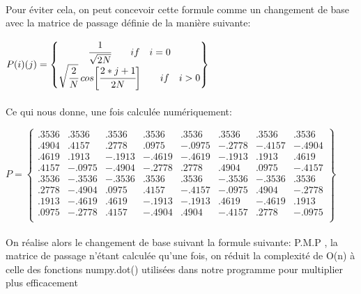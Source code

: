 \documentclass[12pt]{article}
\begin{document}
\paragraph{}
Pour éviter cela, on peut concevoir cette formule comme un changement de base avec la matrice de passage définie de la manière suivante:
\begin{center}
$P(i)(j)=
\begin{Bmatrix}
\cfrac{1}{\sqrt{2N}}  \qquad if \quad i=0 \\
\sqrt{\cfrac{2}{N}} \: cos\biggl[\cfrac{2*j+1}{2N}\biggr] \qquad if \quad i>0 \\
\end{Bmatrix}
$
\end{center}
\paragraph{}
Ce qui nous donne, une fois calculée numériquement:
\begin{center}

$P=
\begin{Bmatrix}

.3536& .3536& .3536& .3536& .3536& .3536& .3536& .3536 \\
.4904& .4157& .2778& .0975& -.0975& -.2778& -.4157& -.4904 \\
.4619& .1913& -.1913& -.4619& -.4619& -.1913& .1913& .4619 \\
.4157& -.0975& -.4904& -.2778 & .2778& .4904& .0975& -.4157 \\
.3536& -.3536& -.3536& .3536& .3536& -.3536& -.3536& .3536 \\
.2778& -.4904& .0975& .4157& -.4157& -.0975& .4904& -.2778 \\
.1913& -.4619& .4619& -.1913& -.1913& .4619& -.4619& .1913 \\
.0975& -.2778& .4157& -.4904& .4904& -.4157& .2778& -.0975 \\

\end{Bmatrix}
$
\end{center}

\paragraph{}
On réalise alors le changement de base suivant la formule suivante: P.M.P , la matrice de passage n'étant calculée qu'une fois, on réduit la complexité de O(n) à celle des fonctions numpy.dot() utilisées dans notre programme pour multiplier plus efficacement 
\newline
\end{document}
